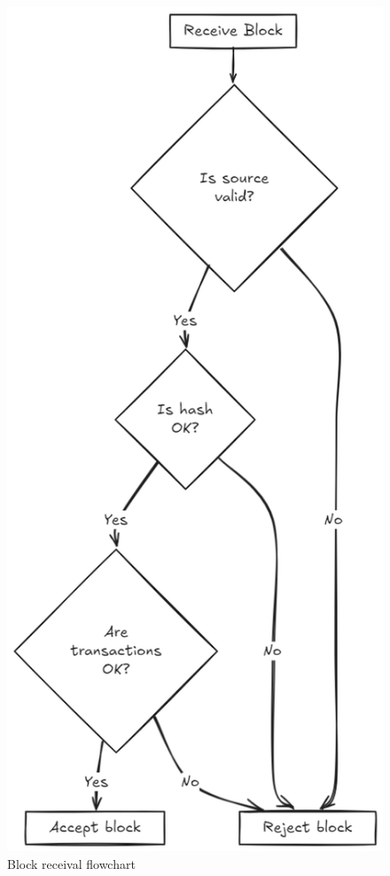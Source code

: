 \documentclass[twocolumn]{article} %
\begin{document}
\begin{figure}[h] %
    \centering
    \includegraphics[width=0.9\columnwidth]{Images/block_receival_diagram.png}
    \caption{Block receival flowchart} 
    \label{fig:block_receival_diagram}
\end{figure}
\end{document}
